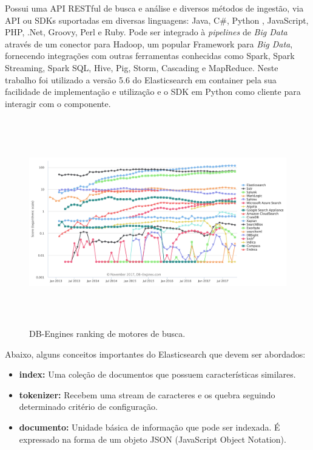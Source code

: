 \documentclass[12pt,a4paper]{article}
\begin{document}
Possui uma API RESTful de busca e análise e diversos métodos de ingestão, via API ou SDKs suportadas em diversas linguagens:
 Java, C\#, Python , JavaScript, PHP, .Net, Groovy, Perl e Ruby. Pode ser integrado à \textit{pipelines} de \textit{Big Data} através
 de um conector para Hadoop, um popular Framework para \textit{Big Data}, fornecendo integrações com outras ferramentas conhecidas como Spark, Spark Streaming, Spark SQL,
 Hive, Pig, Storm, Cascading e MapReduce. Neste trabalho foi utilizado a versão 5.6 do Elasticsearch em container pela sua facilidade de implementação e utilização e o SDK em Python como cliente para interagir com o componente. 

\begin{figure}[H]
	\centering
  \includegraphics[height=9cm]{images/figure_12.png}
  \caption{DB-Engines ranking de motores de busca. \cite{db-engines}}
  \label{fig-search-ranking}
\end{figure}

Abaixo, alguns conceitos importantes do Elasticsearch que devem ser abordados:

 \begin{itemize}
   \item \textbf{index:} Uma coleção de documentos que possuem características similares.
   \item \textbf{tokenizer:} Recebem uma stream de caracteres e os quebra seguindo determinado critério de configuração.
   \item \textbf{documento:} Unidade básica de informação que pode ser indexada. É expressado na forma de um objeto JSON (JavaScript Object Notation).
 \end{itemize}
\end{document}
